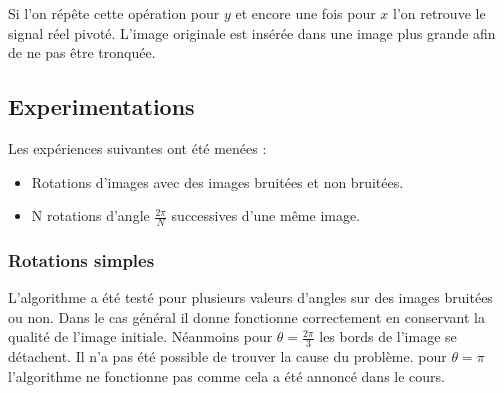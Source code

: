 \documentclass[12pt]{article}
\begin{document}
Si l'on répête cette opération pour $y$ et encore une fois pour $x$ l'on retrouve le signal réel pivoté. L'image originale est insérée dans une image plus grande afin de ne pas être tronquée. \newline

\subsection{Experimentations}

Les expériences suivantes ont été menées : 
\begin{itemize}
\item Rotations d'images avec des images bruitées et non bruitées.
\item N rotations d'angle $\frac{2\pi}{N}$ successives d'une même image. 
\end{itemize}

\subsubsection{Rotations simples}


L'algorithme a été testé pour plusieurs valeurs d'angles sur des images bruitées ou non. Dans le cas général il donne fonctionne correctement en conservant la qualité de l'image initiale. Néanmoins pour $\theta = \frac{2\pi}{3}$ les bords de l'image se détachent. Il n'a pas été possible de trouver la cause du problème. 
pour $\theta = \pi$ l'algorithme ne fonctionne pas comme cela a été annoncé dans le cours. 
\end{document}
